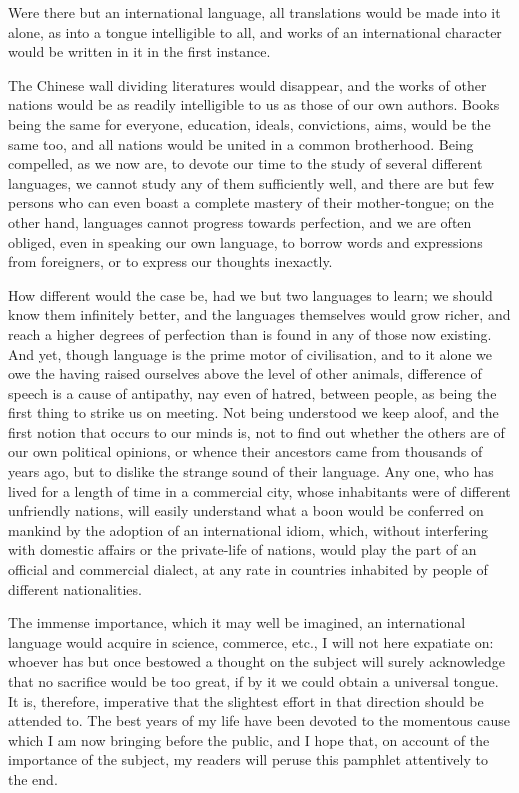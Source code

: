 \documentclass[12pt,twoside]{book}
\begin{document}
Were there but an international language, all translations would be made into it alone, as into a tongue intelligible to all, and works of an international character would be written in it in the first instance.

The Chinese wall dividing literatures would disappear, and the works of other nations would be as readily intelligible to us as those of our own authors. Books being the same for everyone, education, ideals, convictions, aims, would be the same too, and all nations would be united in a common brotherhood. Being compelled, as we now are, to devote our time to the study of several different languages, we cannot study any of them sufficiently well, and there are but few persons who can even boast a complete mastery of their mother-tongue; on the other hand, languages cannot progress towards perfection, and we are often obliged, even in speaking our own language, to borrow words and expressions from foreigners, or to express our thoughts inexactly.

How different would the case be, had we but two languages to learn; we should know them infinitely better, and the languages themselves would grow richer, and reach a higher degrees of perfection than is found in any of those now existing. And yet, though language is the prime motor of civilisation, and to it alone we owe the having raised ourselves above the level of other animals, difference of speech is a cause of antipathy, nay even of hatred, between people, as being the first thing to strike us on meeting. Not being understood we keep aloof, and the first notion that occurs to our minds is, not to find out whether the others are of our own political opinions, or whence their ancestors came from thousands of years ago, but to dislike the strange sound of their language. Any one, who has lived for a length of time in a commercial city, whose inhabitants were of different unfriendly nations, will easily understand what a boon would be conferred on mankind by the adoption of an international idiom, which, without interfering with domestic affairs or the private-life of nations, would play the part of an official and commercial dialect, at any rate in countries inhabited by people of different nationalities.

The immense importance, which it may well be imagined, an international language would acquire in science, commerce, etc., I will not here expatiate on: whoever has but once bestowed a thought on the subject will surely acknowledge that no sacrifice would be too great, if by it we could obtain a universal tongue. It is, therefore, imperative that the slightest effort in that direction should be attended to. The best years of my life have been devoted to the momentous cause which I am now bringing before the public, and I hope that, on account of the importance of the subject, my readers will peruse this pamphlet attentively to the end.
\end{document}
